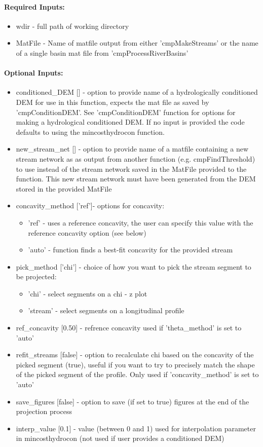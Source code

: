 \paragraph{Required Inputs:}
\begin{itemize}
\item wdir - full path of working directory
\item MatFile - Name of matfile output from either 'cmpMakeStreams' or the name of a single basin mat file from 'cmpProcessRiverBasins'
\end{itemize}

\paragraph{Optional Inputs:}
\begin{itemize}
\item conditioned\_DEM [] - option to provide name of a hydrologically conditioned DEM for use in this function, expects the mat file as saved by 
'cmpConditionDEM'. See 'cmpConditionDEM' function for options for making a hydrological conditioned DEM. If no input is provided the code defaults 
to using the mincosthydrocon function.
\item new\_stream\_net [] - option to provide name of a matfile containing a new stream network as as output from another function (e.g. cmpFindThreshold) to use
instead of the stream network saved in the MatFile provided to the function. This new stream network must have been generated from the
DEM stored in the provided MatFile
\item concavity\_method ['ref']- options for concavity:
\begin{itemize}
\item 'ref' - uses a reference concavity, the user can specify this value with the reference concavity option (see below)
\item 'auto' - function finds a best-fit concavity for the provided stream
\end{itemize}
\item pick\_method ['chi'] - choice of how you want to pick the stream segment to be projected:
\begin{itemize}
\item 'chi' - select segments on a chi - z plot
\item 'stream' - select segments on a longitudinal profile
\end{itemize}
\item ref\_concavity [0.50] - refrence concavity used if 'theta\_method' is set to 'auto'
\item refit\_streams [false] - option to recalculate chi based on the concavity of the picked segment (true), useful if you want to try to precisely 
match the shape of the picked segment of the profile. Only used if 'concavity\_method' is set to 'auto'
\item save\_figures [false] - option to save (if set to true) figures at the end of the projection process
\item interp\_value [0.1] - value (between 0 and 1) used for interpolation parameter in mincosthydrocon (not used if user provides a conditioned DEM)
\end{itemize}

